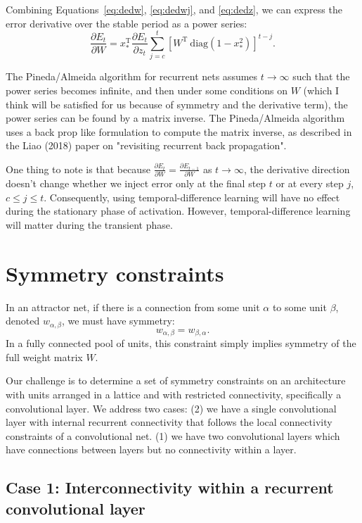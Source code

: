 \documentclass[11pt,letterpaper]{article}
\newcommand{\T}{{\ensuremath{\mathrm{T}}}}
\newcommand{\diag}{{\ensuremath{\mathrm{diag}}}}
\begin{document}
Combining Equations~\ref{eq:dedw}, \ref{eq:dedwj}, and \ref{eq:dedz}, we can express the error derivative over
the stable period as a power series:
\[
\frac{\partial E_t}{\partial W} = 
x_*^{\T}
\frac{\partial E_t}{\partial z_t}  
\sum_{j=c}^t 
\left[ W^{\T} ~\diag(1-x_*^2) \right] ^{t-j} .
\]

The Pineda/Almeida algorithm for recurrent nets
assumes $t \to \infty$ such that the power series becomes infinite, and then
under some conditions on $W$ (which I think will be satisfied for us because of symmetry and the derivative term), the power series can be found by a matrix 
inverse. The Pineda/Almeida algorithm uses a back prop like formulation to
compute the matrix inverse, as described in the Liao (2018) paper on 
"revisiting recurrent back propagation".

One thing to note is that because $\frac{\partial E_t}{\partial W} =
\frac{\partial E_{t-1}}{\partial W} $ as $t\to\infty$,
the derivative direction doesn't change whether we inject error
only at the final step $t$ or at every step $j$, $c \le j \le t$. 
Consequently, using temporal-difference learning will have no effect during
the stationary phase of activation.
However, temporal-difference learning will
matter during the transient phase.


\section{Symmetry constraints}

In an attractor net, if there is a connection from some unit $\alpha$ to
some unit $\beta$, denoted $w_{\alpha,\beta}$, we must have symmetry:
\[
w_{\alpha,\beta} = w_{\beta,\alpha} .
\]
In a fully connected pool of units, this constraint simply implies symmetry
of the full weight matrix $W$.

Our challenge is to determine a set of symmetry constraints on an architecture 
with units arranged in a lattice and with restricted connectivity, specifically
a convolutional layer. We address  two cases: 
(2) we have a single convolutional layer with internal recurrent connectivity
that follows the local connectivity constraints of a convolutional net.
(1) we have two convolutional 
layers which have connections between layers but no connectivity within a layer.

\subsection{Case 1: Interconnectivity within a recurrent convolutional layer}
\end{document}
